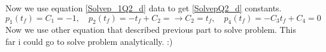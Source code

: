 Now we use equation \ref{Solvep_1Q2_d} data to get \ref{SolvepQ2_d} constants.
$$p_1(t_f) = C_1 = -1, \quad p_2(t_f) = -t_f + C_2 =  \to C_2 = t_f, \quad p_4(t_f) = -C_3t_f +‌C_4= 0$$
Now we use other equation that described previous part to solve problem.
This far i could go to solve problem analytically. :)